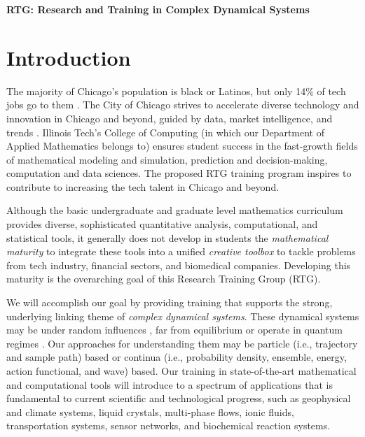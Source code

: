 \documentclass[11pt]{NSFamsart}
\newcommand{\FredNote}[1]{{\color{blue} Fred: #1}}
\begin{document}
  

\centerline{\large \textbf{RTG: Research and Training in Complex Dynamical Systems}}

\section{Introduction}

The majority of Chicago's population is black or Latinos, but only 14\%   of tech jobs go to them \cite{P33}. 
The City of Chicago strives to accelerate diverse  technology and innovation in Chicago and beyond, guided by data, market intelligence, and trends \cite{Chicago}. Illinois Tech's College of Computing (in which our Department of Applied Mathematics belongs to)  ensures student success in the fast-growth fields of mathematical modeling and simulation,   prediction and decision-making, computation and data sciences. The proposed RTG training program inspires to contribute to increasing the tech talent in Chicago and beyond.


Although the basic undergraduate and graduate level mathematics curriculum provides  diverse, sophisticated quantitative  analysis, computational, and statistical tools, it generally does not develop in students the \emph{mathematical maturity} to integrate these tools into a unified \emph{creative toolbox} to tackle problems from tech industry, financial sectors, and biomedical companies. Developing this maturity is the overarching goal of this Research Training Group (RTG). 


We will accomplish our goal by providing training that supports the strong, underlying linking theme of \emph{complex dynamical systems}.  These dynamical systems may be under random influences \cite{Arnold, DuanBook2015}, far from equilibrium \cite{liu2009introduction} or operate in quantum regimes \cite{Dittrich2016}. Our approaches for understanding them may be particle (i.e., trajectory and sample path) based or continua (i.e., probability density, ensemble, energy, action functional, and wave) based.  Our training in state-of-the-art mathematical and computational tools will introduce to a spectrum of applications that is fundamental to current scientific and technological progress, such as geophysical and climate systems, liquid crystals, multi-phase flows, ionic fluids,  transportation systems, sensor networks, and biochemical reaction systems. 
\end{document}
